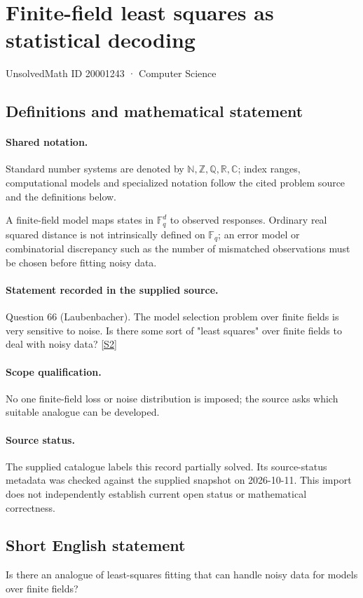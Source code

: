 \documentclass[11pt]{article}
\newcommand{\sref}[2]{\hyperlink{source:#1:#2}{[S#2]}}
\begin{document}
\setcounter{section}{20001242}
\section{Finite-field least squares as statistical decoding}\label{20001243}
{\small\sffamily UnsolvedMath ID 20001243 · Computer Science}
\subsection{Definitions and mathematical statement}

\paragraph{Shared notation.}Standard number systems are denoted by $\mathbb N,\mathbb Z,\mathbb Q,\mathbb R,\mathbb C$; index ranges, computational models and specialized notation follow the cited problem source and the definitions below.


A finite-field model maps states in $\mathbb F_q^d$ to observed responses. Ordinary real squared distance is not intrinsically defined on $\mathbb F_q$; an error model or combinatorial discrepancy such as the number of mismatched observations must be chosen before fitting noisy data.
\paragraph{Statement recorded in the supplied source.}
Question 66 (Laubenbacher). The model selection problem over finite fields is very sensitive to noise. Is there some sort of "least squares" over finite fields to deal with noisy data? \sref{20001243}{2}
\paragraph{Scope qualification.}
No one finite-field loss or noise distribution is imposed; the source asks which suitable analogue can be developed.
\paragraph{Source status.}
The supplied catalogue labels this record partially solved. Its source-status metadata was checked against the supplied snapshot on 2026-10-11. This import does not independently establish current open status or mathematical correctness.
\subsection{Short English statement}
Is there an analogue of least-squares fitting that can handle noisy data for models over finite fields?
\end{document}

